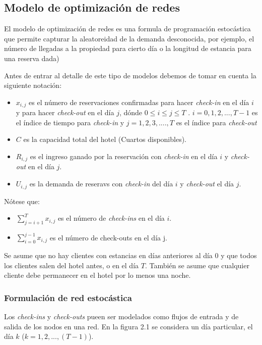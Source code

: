 { \subsection*{Modelo de optimización de redes}

El modelo de optimización de redes es una formula de programación estocástica que permite capturar la aleatoreidad de la demanda desconocida, por ejemplo, el número de llegadas a la propiedad para cierto día o la longitud de estancia para una reserva dada)

Antes de entrar al detalle de este tipo de modelos debemos de tomar en cuenta la siguiente notación:

\begin{itemize}
  \item $x_{i,j}$ es el número de reservaciones confirmadas para hacer \emph{check-in} en el día $i$ y para hacer \emph{check-out} en el día $j$, dónde $0\leq i \leq j \leq T$ . $i={0,1,2,...,T-1}$ es el índice de tiempo para \emph{check-in} y $j={1,2,3,....,T}$ es el índice para \emph{check-out}
  \item $C$ es la capacidad total del hotel (Cuartos disponibles).
  \item $R_{i,j}$ es el ingreso ganado por la reservación con \emph{check-in} en el día $i$ y \emph{check-out} en el día $j$.
  \item $U_{i,j}$ es la demanda de reseravs con \emph{check-in} del día $i$ y \emph{check-out} el día $j$.
\end{itemize}

Nótese que:

\begin{itemize}
  \item $\sum_{j=i+1}^{T} x_{i,j}$ es el número de \emph{check-ins} en el día $i$.
  \item $\sum_{i=0}^{j-1} x_{i,j}$ es el número de check-outs en el día j.
\end{itemize}

Se asume que no hay clientes con estancias en días anteriores al día 0 y que todos los clientes salen del hotel antes, o en el día $T$. También se asume que cualquier cliente debe permanecer en el hotel por lo menos una noche.

\subsubsection*{Formulación de red estocástica}

Los \emph{check-ins} y \emph{check-outs} pueen ser modelados como flujos de entrada y de salida de los nodos en una red. En la figura 2.1 se considera un día particular, el día $k$ ($k={1,2,...,(T-1)}$).

}
